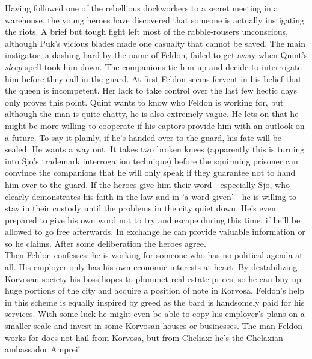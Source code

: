 Having followed one of the rebellious dockworkers to a secret meeting in a warehouse, the young heroes have discovered that someone is actually instigating the riots. A brief but tough fight left most of the rabble-rousers unconscious, although Puk's vicious blades made one casualty that cannot be saved. The main instigator, a dashing bard by the name of Feldon, failed to get away when Quint's {\itshape sleep} spell took him down. The companions tie him up and decide to interrogate him before they call in the guard. At first Feldon seems fervent in his belief that the queen is incompetent. Her lack to take control over the last few hectic days only proves this point. Quint wants to know who Feldon is working for, but although the man is quite chatty, he is also extremely vague. He lets on that he might be more willing to cooperate if his captors provide him with an outlook on a future. To say it plainly, if he's handed over to the guard, his fate will be sealed. He wants a way out. It takes two broken knees (apparently this is turning into Sjo's trademark interrogation technique) before the squirming prisoner can convince the companions that he will only speak if they guarantee not to hand him over to the guard. If the heroes give him their word - especially Sjo, who clearly demonstrates his faith in the law and in 'a word given' - he is willing to stay in their custody until the problems in the city quiet down. He's even prepared to give his own word not to try and escape during this time, if he'll be allowed to go free afterwards. In exchange he can provide valuable information or so he claims. After some deliberation the heroes agree.\\

Then Feldon confesses: he is working for someone who has no political agenda at all. His employer only has his own economic interests at heart. By destabilizing Korvosan society his boss hopes to plummet real estate prices, so he can buy up huge portions of the city and acquire a position of note in Korvosa. Feldon's help in this scheme is equally inspired by greed as the bard is handsomely paid for his services. With some luck he might even be able to copy his employer's plans on a smaller scale and invest in some Korvosan houses or businesses. The man Feldon works for does not hail from Korvosa, but from Cheliax: he's the Chelaxian ambassador Amprei!\\

